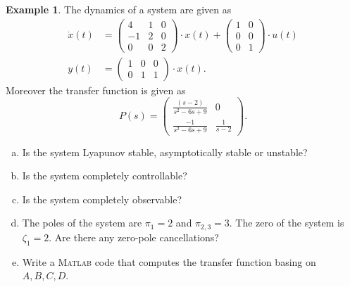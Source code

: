 \documentclass[a4paper,12 pt]{article}
\numberwithin{equation}{section}
\theoremstyle{definition}
\newtheorem{bsp}{Example}
\theoremstyle{remark}
\theoremstyle{definition}
\theoremstyle{definition}
\theoremstyle{definition}
\theoremstyle{remark}
\begin{document}
\newpage
\begin{bsp}
The dynamics of a system are given as
\begin{equation}
\begin{split}
\dot{x}(t)&=\begin{pmatrix}
4&1&0\\
-1&2&0\\
0&0&2
\end{pmatrix}\cdot x(t)+\begin{pmatrix}
1&0\\
0&0\\
0&1
\end{pmatrix}\cdot u(t)\\
y(t)&=\begin{pmatrix} 1&0&0\\ 0&1&1\end{pmatrix} \cdot x(t).
\end{split}
\end{equation}
Moreover the transfer function is given as
\begin{equation}
P(s)=\begin{pmatrix}
\frac{(s-2)}{s^2-6s+9}&0\\[6pt]
\frac{-1}{s^2-6s+9}&\frac{1}{s-2}
\end{pmatrix}.
\end{equation}

\begin{enumerate}[(a)]
\item Is the system Lyapunov stable, asymptotically stable or unstable?
\item Is the system completely controllable?
\item Is the system completely observable?
\item The poles of the system are $\pi_1=2$ and $\pi_{2,3}=3$. The zero of the system is $\zeta_1=2$. Are there any zero-pole cancellations? 
\item Write a \textsc{Matlab} code that computes the transfer function basing on $A,B,C,D$.
\end{enumerate}


\end{bsp}
\end{document}
